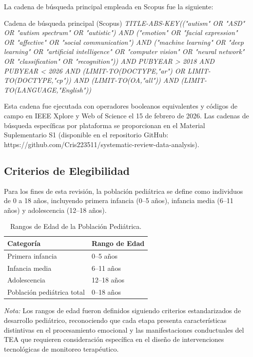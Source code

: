\documentclass[ASNA,twocolumn]{USG}
\begin{document}
	La cadena de búsqueda principal empleada en Scopus fue la siguiente:
	
	\begin{boxwithhead}
		{Cadena de búsqueda principal (Scopus)}
		{\noindent\textit{TITLE-ABS-KEY(("autism" OR "ASD" OR "autism spectrum"
				OR "autistic") AND ("emotion" OR "facial expression" OR "affective"
				OR "social communication") AND ("machine learning" OR "deep learning"
				OR "artificial intelligence" OR "computer vision" OR "neural network"
				OR "classification" OR "recognition")) AND PUBYEAR > 2018
				AND PUBYEAR < 2026 AND (LIMIT-TO(DOCTYPE,"ar")
				OR LIMIT-TO(DOCTYPE,"cp")) AND (LIMIT-TO(OA,"all"))
				AND (LIMIT-TO(LANGUAGE,"English"))}}
	\end{boxwithhead}
	
	Esta cadena fue ejecutada con operadores booleanos equivalentes y códigos de
	campo en IEEE Xplore y Web of Science el 15 de febrero de 2026. Las cadenas de
	búsqueda específicas por plataforma se proporcionan en el Material Suplementario
	S1 (disponible en el repositorio GitHub:
	https://github.com/Cris223511/systematic-review-data-analysis).
	
	\subsection{Criterios de Elegibilidad}\label{sec2d}
	
	Para los fines de esta revisión, la población pediátrica se define como
	individuos de 0 a 18 años, incluyendo primera infancia (0--5 años), infancia
	media (6--11 años) y adolescencia (12--18 años).
	
	\begin{table}[!ht]
		\caption{Rangos de Edad de la Población Pediátrica.\label{tab2}}
		\begin{tabular*}{\columnwidth}{@{\extracolsep\fill}ll@{\extracolsep\fill}}
			\toprule
			\textbf{Categoría} & \textbf{Rango de Edad} \\
			\midrule
			Primera infancia           & 0--5 años  \\
			Infancia media             & 6--11 años \\
			Adolescencia               & 12--18 años \\
			Población pediátrica total & 0--18 años \\
			\bottomrule
		\end{tabular*}
		\begin{tablenotes}
			\item {\it Nota:} Los rangos de edad fueron definidos siguiendo criterios
			estandarizados de desarrollo pediátrico, reconociendo que cada etapa presenta
			características distintivas en el procesamiento emocional y las manifestaciones
			conductuales del TEA que requieren consideración específica en el diseño de
			intervenciones tecnológicas de monitoreo terapéutico.
		\end{tablenotes}
	\end{table}
	
\end{document}
